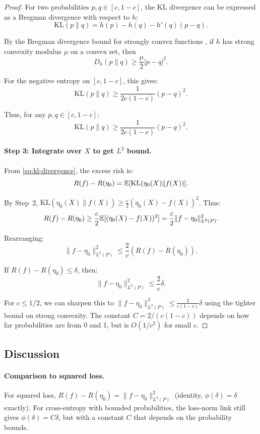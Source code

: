 \documentclass[12pt]{article}
\begin{document}
\begin{proof}
For two probabilities $p, q \in [c, 1-c]$, the KL divergence can be expressed as a Bregman divergence with respect to $h$:
\[
\text{KL}(p \| q) = h(p) - h(q) - h'(q)(p-q).
\]

By the Bregman divergence bound for strongly convex functions \citep{zhang2004statistical}, if $h$ has strong convexity modulus $\mu$ on a convex set, then
\[
D_h(p \| q) \geq \frac{\mu}{2} |p - q|^2.
\]

For the negative entropy on $[c,1-c]$, this gives:
\[
\text{KL}(p \| q) \geq \frac{1}{2c(1-c)} (p - q)^2.
\]

Thus, for any $p, q \in [c, 1-c]$:
\[
\text{KL}(p \| q) \geq \frac{1}{2c(1-c)} (p - q)^2.
\]

\paragraph{Step 3: Integrate over $X$ to get $L^2$ bound.}

From \eqref{eq:kl-divergence}, the excess risk is:
\[
R(f) - R(\eta_0) = \mathbb{E}[\text{KL}(\eta_0(X) \| f(X))].
\]

By Step~2, $\text{KL}(\eta_0(X) \| f(X)) \ge \frac{c}{2} (\eta_0(X) - f(X))^2$. Thus:
\[
R(f) - R(\eta_0) \ge \frac{c}{2} \mathbb{E}[(\eta_0(X) - f(X))^2] = \frac{c}{2} \|f - \eta_0\|_{L^2(P)}^2.
\]

Rearranging:
\[
\|f - \eta_0\|_{L^2(P)}^2 \le \frac{2}{c} (R(f) - R(\eta_0)).
\]

If $R(f) - R(\eta_0) \le \delta$, then:
\[
\|f - \eta_0\|_{L^2(P)}^2 \le \frac{2}{c} \delta.
\]

For $c \le 1/2$, we can sharpen this to $\|f - \eta_0\|_{L^2(P)}^2 \le \frac{2}{c(1-c)} \delta$ using the tighter bound on strong convexity. The constant $C = 2/(c(1-c))$ depends on how far probabilities are from 0 and 1, but is $O(1/c^2)$ for small $c$.
\end{proof}

\subsection{Discussion}

\paragraph{Comparison to squared loss.}
For squared loss, $R(f) - R(\eta_0) = \|f - \eta_0\|_{L^2(P)}^2$ (identity, $\phi(\delta) = \delta$ exactly). For cross-entropy with bounded probabilities, the loss-norm link still gives $\phi(\delta) = C\delta$, but with a constant $C$ that depends on the probability bounds.
\end{document}
